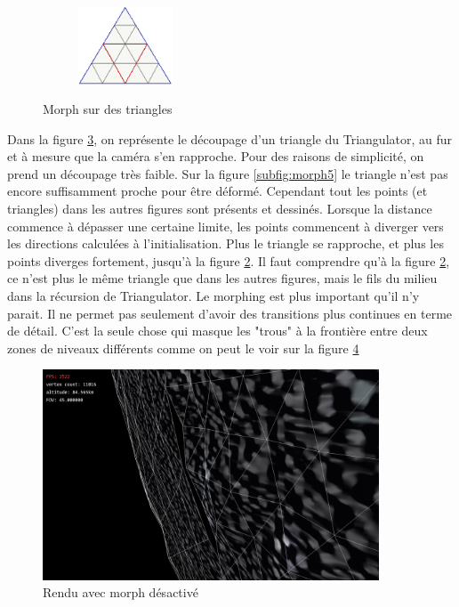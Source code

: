 \begin{figure}[H]
\begin{subfigure}[b]{0.16\textwidth}
       \caption{}\label{subfig:morph2}
    \end{subfigure}
     ~
    \begin{subfigure}[b]{0.16\textwidth}
       \centering \includegraphics[width=\textwidth,height=2.3cm]{img/morph1.png}
       \caption{}\label{subfig:morph1}
    \end{subfigure}
    \caption{Morph sur des triangles}\label{fig:morphTri}
\end{figure}

    Dans la figure \ref{fig:morphTri}, on représente le découpage d'un triangle du Triangulator, au fur et à mesure que la caméra s'en rapproche. Pour des raisons de simplicité, on prend un découpage très faible.
    Sur la figure \ref{subfig:morph5} le triangle n'est pas encore suffisamment proche pour être déformé. Cependant tout les points (et triangles) dans les autres figures sont présents et dessinés. 
    Lorsque la distance commence à dépasser une certaine limite, les points commencent à diverger vers les directions calculées à l'initialisation. Plus le triangle se rapproche, et plus les points diverges fortement, jusqu'à la figure \ref{subfig:morph1}. Il faut comprendre qu'à la figure \ref{subfig:morph1}, ce n'est plus le même triangle que dans les autres figures, mais le fils du milieu dans la récursion de Triangulator.
    Le morphing est plus important qu'il n'y parait. Il ne permet pas seulement d'avoir des transitions plus continues en terme de détail. C'est la seule chose qui masque les "trous" à la frontière entre deux zones de niveaux différents comme on peut le voir sur la figure \ref{fig:noMorphingHole}
 \begin{figure}[H]
  \centerline{
  \includegraphics[width=10cm]{img/noMorphingHole.png}}
  \caption{Rendu avec morph désactivé}
  \label{fig:noMorphingHole}
  \end{figure}

